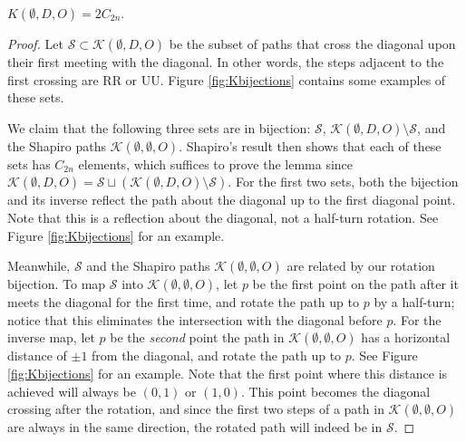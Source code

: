 \documentclass[10pt]{article}
\begin{document}
\begin{lemma} \label{lemma:KnullDO}
$K(\emptyset,D,O) = 2C_{2n}$.
\end{lemma}
\begin{proof}
Let $\mathcal{S} \subset \mathcal{K}(\emptyset, D, O)$ be the subset of paths that cross the diagonal upon their first meeting with the diagonal. In other words, the steps adjacent to the first crossing are RR or UU. Figure \ref{fig:Kbijections} contains some examples of these sets.

We claim that the following three sets are in bijection: $\mathcal{S}$,  $\mathcal{K}(\emptyset,D,O)\setminus\mathcal{S}$, and the Shapiro paths $\mathcal{K}(\emptyset, \emptyset, O)$.  Shapiro's result then shows that each of these sets has $C_{2n}$ elements, which suffices to prove the lemma since $\mathcal{K}(\emptyset, D, O) = \mathcal{S}\sqcup (\mathcal{K}(\emptyset, D, O) \setminus \mathcal{S}).$ For the first two sets, both the bijection and its inverse reflect the path about the diagonal up to the first diagonal point. Note that this is a reflection about the diagonal, not a half-turn rotation.  See Figure \ref{fig:Kbijections} for an example. 

Meanwhile, $\mathcal{S}$ and the Shapiro paths $\mathcal{K}(\emptyset, \emptyset, O)$ are related by our rotation bijection.  To map $\mathcal{S}$ into  $\mathcal{K}(\emptyset,\emptyset,O)$, let $p$ be the first point on the path after it meets the diagonal for the first time, and rotate the path up to $p$ by a half-turn; notice that this eliminates the intersection with the diagonal before $p$.  For the inverse map, let $p$ be the \textit{second} point the path in $\mathcal{K}(\emptyset, \emptyset, O)$ has a horizontal distance of $\pm 1$ from the diagonal, and rotate the path up to $p$.  See Figure \ref{fig:Kbijections} for an example. Note that the first point where this distance is achieved will always be $(0,1)$ or $(1,0)$. This point becomes the diagonal crossing after the rotation, and since the first two steps of a path in $\mathcal{K}(\emptyset, \emptyset, O)$ are always in the same direction, the rotated path will indeed be in $\mathcal{S}$. 
\end{proof}
\end{document}

